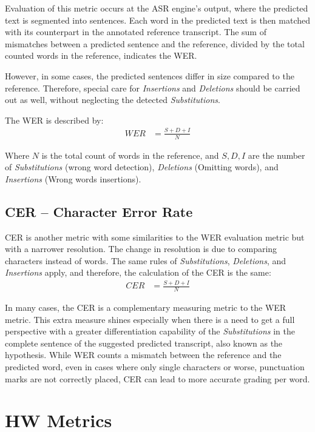 Evaluation of this metric occurs at the ASR engine's output, 
where the predicted text is segmented into sentences. 
Each word in the predicted
text is then matched with its counterpart in the 
annotated reference transcript. 
The sum of mismatches between a predicted sentence and the reference, 
divided by the total counted words in the reference, indicates the WER.

However, in some cases, the predicted sentences differ in size compared
to the reference. Therefore, special care for \emph{Insertions}
and \emph{Deletions} should be carried out as well, without neglecting
the detected \emph{Substitutions}.

The WER is described by:
\begin{align}
    WER & = \frac{S + D + I}{N}
\end{align}

Where \(N\) is the total count of words in the reference,
and \(S,D,I\) are the number of \emph{Substitutions} (wrong word detection),
\emph{Deletions} (Omitting words),
and \emph{Insertions} (Wrong words insertions).

\subsection{CER -- Character Error Rate}
CER is another metric with some similarities to the 
WER evaluation metric but with a narrower resolution.
The change in resolution is due to comparing characters instead of words.
The same rules of \emph{Substitutions}, \emph{Deletions}, and \emph{Insertions}
apply, and therefore, the calculation of the CER is the same:
\begin{align}
    CER & = \frac{S + D + I}{N}
\end{align}

In many cases, the CER\cite{_isword} is a complementary 
measuring metric to the WER
metric.
This extra measure shines especially 
when there is a need to get a full perspective 
with a greater differentiation capability of the 
\emph{Substitutions} in the complete sentence 
of the suggested predicted transcript,
 also known as the hypothesis. 
While WER counts a mismatch between the reference and the predicted 
word, even in cases where only single characters or worse, 
punctuation marks are not correctly placed, CER can lead to 
more accurate grading per word.

\section{HW Metrics}
